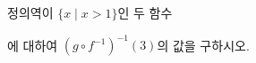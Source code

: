 \hspace*{2mm}\begin{minipage}[t]{\dimexpr\linewidth-2mm\relax}\vspace{0pt}
정의역이 $\{x \mid x>1\}$인 두 함수 \par\smallskip{}\par\smallskip\noindent 에 대하여 $(g\circ f^{-1})^{-1}(3)$의 값을 구하시오.\end{minipage}
